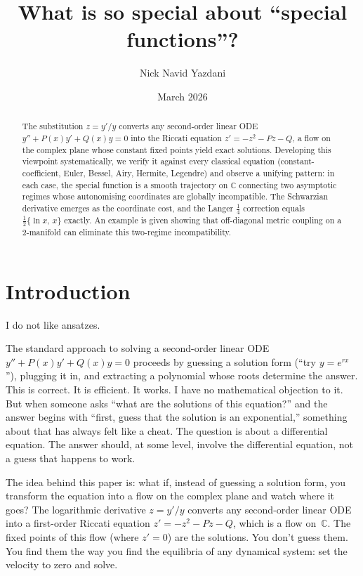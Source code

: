 \documentclass{amsart}
\title{What is so special about ``special functions''?}
\author{Nick Navid Yazdani}
\date{March 2026}
\theoremstyle{definition}
\theoremstyle{remark}
\begin{document}
\begin{abstract}
The substitution $z = y'/y$ converts any second-order linear ODE
$y'' + P(x)y' + Q(x)y = 0$ into the Riccati equation
$z' = -z^2 - Pz - Q$, a flow on the complex plane whose constant
fixed points yield exact solutions. Developing this viewpoint
systematically, we verify it against every classical equation
(constant-coefficient, Euler, Bessel, Airy, Hermite, Legendre) and
observe a unifying pattern: in each case, the special function is a
smooth trajectory on $\mathbb{C}$ connecting two asymptotic regimes
whose autonomising coordinates are globally incompatible. The
Schwarzian derivative emerges as the coordinate cost, and the Langer
$\tfrac{1}{4}$ correction equals $\tfrac{1}{2}\{\ln x,\, x\}$
exactly. An example is given showing that off-diagonal metric coupling
on a 2-manifold can eliminate this two-regime incompatibility.
\end{abstract}

\maketitle

\section{Introduction}

I do not like ansatzes.

The standard approach to solving a second-order linear ODE $y'' + P(x)y' + Q(x)y = 0$ proceeds by guessing a solution form (``try $y = e^{rx}$''), plugging it in, and extracting a polynomial whose roots determine the answer. This is correct. It is efficient. It works. I have no mathematical objection to it. But when someone asks ``what are the solutions of this equation?'' and the answer begins with ``first, guess that the solution is an exponential,'' something about that has always felt like a cheat. The question is about a differential equation. The answer should, at some level, involve the differential equation, not a guess that happens to work.

The idea behind this paper is: what if, instead of guessing a solution form, you transform the equation into a flow on the complex plane and watch where it goes? The logarithmic derivative $z = y'/y$ converts any second-order linear ODE into a first-order Riccati equation $z' = -z^2 - Pz - Q$, which is a flow on~$\mathbb{C}$. The fixed points of this flow (where $z' = 0$) are the solutions. You don't guess them. You find them the way you find the equilibria of any dynamical system: set the velocity to zero and solve.
\end{document}
